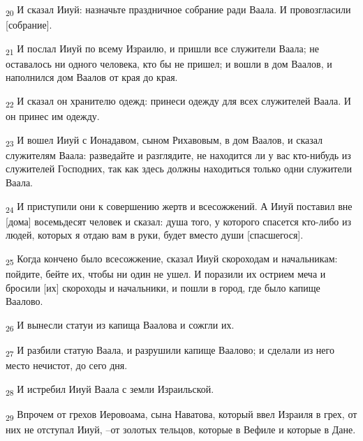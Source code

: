 \begin{tcolorbox}
\textsubscript{20} И сказал Ииуй: назначьте праздничное собрание ради Ваала. И провозгласили [собрание].
\end{tcolorbox}
\begin{tcolorbox}
\textsubscript{21} И послал Ииуй по всему Израилю, и пришли все служители Ваала; не оставалось ни одного человека, кто бы не пришел; и вошли в дом Ваалов, и наполнился дом Ваалов от края до края.
\end{tcolorbox}
\begin{tcolorbox}
\textsubscript{22} И сказал он хранителю одежд: принеси одежду для всех служителей Ваала. И он принес им одежду.
\end{tcolorbox}
\begin{tcolorbox}
\textsubscript{23} И вошел Ииуй с Ионадавом, сыном Рихавовым, в дом Ваалов, и сказал служителям Ваала: разведайте и разглядите, не находится ли у вас кто-нибудь из служителей Господних, так как здесь должны находиться только одни служители Ваала.
\end{tcolorbox}
\begin{tcolorbox}
\textsubscript{24} И приступили они к совершению жертв и всесожжений. А Ииуй поставил вне [дома] восемьдесят человек и сказал: душа того, у которого спасется кто-либо из людей, которых я отдаю вам в руки, будет вместо души [спасшегося].
\end{tcolorbox}
\begin{tcolorbox}
\textsubscript{25} Когда кончено было всесожжение, сказал Ииуй скороходам и начальникам: пойдите, бейте их, чтобы ни один не ушел. И поразили их острием меча и бросили [их] скороходы и начальники, и пошли в город, где было капище Ваалово.
\end{tcolorbox}
\begin{tcolorbox}
\textsubscript{26} И вынесли статуи из капища Ваалова и сожгли их.
\end{tcolorbox}
\begin{tcolorbox}
\textsubscript{27} И разбили статую Ваала, и разрушили капище Ваалово; и сделали из него место нечистот, до сего дня.
\end{tcolorbox}
\begin{tcolorbox}
\textsubscript{28} И истребил Ииуй Ваала с земли Израильской.
\end{tcolorbox}
\begin{tcolorbox}
\textsubscript{29} Впрочем от грехов Иеровоама, сына Наватова, который ввел Израиля в грех, от них не отступал Ииуй, --от золотых тельцов, которые в Вефиле и которые в Дане.
\end{tcolorbox}
